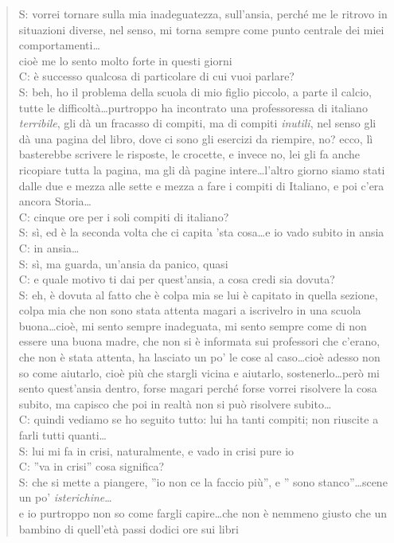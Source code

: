 \begin{verse}
S: vorrei tornare sulla mia inadeguatezza, sull'ansia, perché me le ritrovo in situazioni diverse, nel senso, mi torna sempre come punto centrale dei miei comportamenti\ldots\\ cioè me lo sento molto forte in questi giorni\\
C: è successo qualcosa di particolare di cui vuoi parlare?\\
S: beh, ho il problema della scuola di mio figlio piccolo, a parte il calcio, tutte le difficoltà\ldots{}purtroppo ha incontrato una professoressa di italiano \emph{terribile}, gli dà un fracasso di compiti, ma di compiti \emph{inutili}, nel senso gli dà una pagina del libro, dove ci sono gli esercizi da riempire, no? ecco, lì basterebbe scrivere le risposte, le crocette, e invece no, lei gli fa anche ricopiare tutta la pagina, ma gli dà pagine intere\ldots{}l'altro giorno siamo stati dalle due e mezza alle sette e mezza a fare i compiti di Italiano, e poi c'era ancora Storia\ldots\\
C: cinque ore per i soli compiti di italiano?\\
S: sì, ed è la seconda volta che ci capita 'sta cosa\ldots{}e io vado subito in ansia\\
C: in ansia\ldots\\
S: sì, ma guarda, un'ansia da panico, quasi\\
C: e quale motivo ti dai per quest'ansia, a cosa credi sia dovuta?\\
S: eh, è dovuta al fatto che è colpa mia se lui è capitato in quella sezione, colpa mia che non sono stata attenta magari a iscrivelro in una scuola buona\ldots{}cioè, mi sento sempre inadeguata, mi sento sempre come di non essere una buona madre, che non si è informata sui professori che c'erano, che non è stata attenta, ha lasciato un po' le cose al caso\ldots{}cioè adesso non so come aiutarlo, cioè più che stargli vicina e aiutarlo, sostenerlo\ldots{}però mi sento quest'ansia dentro, forse magari perché forse vorrei risolvere la cosa subito, ma capisco che poi in realtà non si può risolvere subito\ldots\\
C: quindi vediamo se ho seguito tutto: lui ha tanti compiti; non riuscite a farli tutti quanti\ldots\\
S: lui mi fa in crisi, naturalmente, e vado in crisi pure io\\
C: ''va in crisi'' cosa significa?\\
S: che si mette a piangere, ''io non ce la faccio più'', e '' sono stanco''\ldots{}scene un po' \emph{isterichine}\ldots\\ e io purtroppo non so come fargli capire\ldots{}che non è nemmeno giusto che un bambino di quell'età passi dodici ore sui libri\\
\end{verse}

